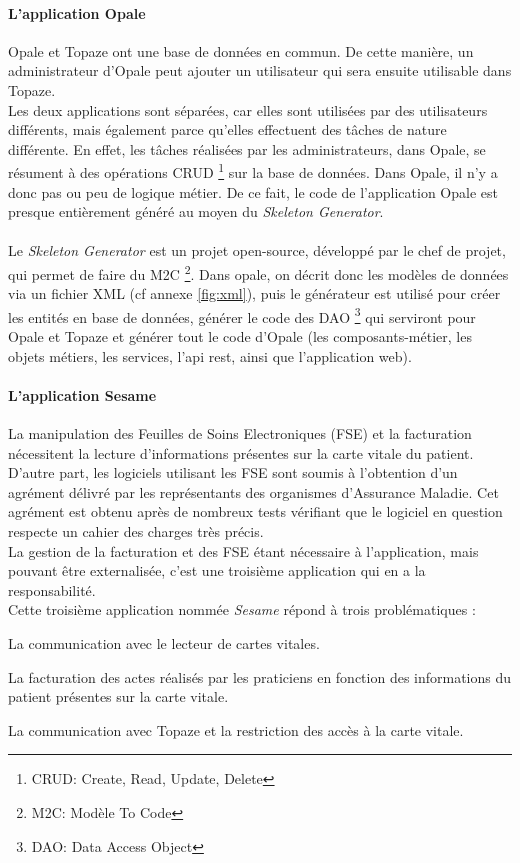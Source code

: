 \paragraph*{L'application Opale\\}
Opale et Topaze ont une base de données en commun. De cette manière, un administrateur d'Opale peut ajouter un utilisateur qui sera ensuite utilisable dans Topaze. \\
Les deux applications sont séparées, car elles sont utilisées par des utilisateurs différents, mais également parce qu'elles effectuent des tâches de nature différente. En effet, les tâches réalisées par les administrateurs, dans Opale, se résument à des opérations CRUD \footnote{CRUD: Create, Read, Update, Delete} sur la base de données. Dans Opale, il n'y a donc pas ou peu de logique métier. 
De ce fait, le code de l'application Opale est presque entièrement généré au moyen du \textit{Skeleton Generator}.\\ \\
Le \textit{Skeleton Generator} est un projet open-source, développé par le chef de projet, qui permet de faire du M2C \footnote{M2C: Modèle To Code}. Dans opale, on décrit donc les modèles de données via un fichier XML (cf annexe \ref{fig:xml}), puis le générateur est utilisé pour créer les entités en base de données, générer le code des DAO \footnote{DAO: Data Access Object} qui serviront pour Opale et Topaze et générer tout le code d'Opale (les composants-métier, les objets métiers, les services, l'api rest, ainsi que l'application web). 

\paragraph*{L'application Sesame\\}

La manipulation des Feuilles de Soins Electroniques (\gls{FSE}) et la facturation nécessitent la lecture d'informations présentes sur la carte vitale du patient. D'autre part, les logiciels utilisant les \gls{FSE} sont soumis à l’obtention d’un agrément délivré
par les représentants des organismes d’Assurance Maladie. Cet agrément est obtenu après de
nombreux tests vérifiant que le logiciel en question respecte un cahier des charges très précis.\\
La gestion de la facturation et des \gls{FSE} étant nécessaire à l’application, mais pouvant
être externalisée, c’est une troisième application qui en a la responsabilité. \\
Cette troisième application nommée \textit{Sesame} répond à trois problématiques : 
\begin{sitemize}
\item La communication avec le lecteur de cartes vitales.
\item La facturation des actes réalisés par les praticiens en fonction des informations du patient présentes sur la carte vitale.
\item La communication avec Topaze et la restriction des accès à la carte vitale.
\end{sitemize}

